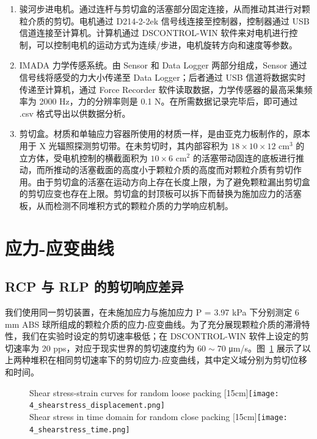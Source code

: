 \begin{enumerate}
    \item 骏河步进电机。通过连杆与剪切盒的活塞部分固定连接，从而推动其进行对颗粒介质的剪切。电机通过 D214-2-2ek 信号线连接至控制器，控制器通过 USB 信道连接至计算机。计算机通过 DSCONTROL-WIN 软件来对电机进行控制，可以控制电机的运动方式为连续/步进，电机旋转方向和速度等参数。
    \item IMADA 力学传感系统。由 Sensor 和 Data Logger 两部分组成，Sensor 通过信号线将感受的力大小传递至 Data Logger；后者通过 USB 信道将数据实时传递至计算机，通过 Force Recorder 软件读取数据，力学传感器的最高采集频率为 2000 \unit{\hertz}，力的分辨率则是 0.1 \unit{\newton}。在所需数据记录完毕后，即可通过 .csv 格式导出以供数据分析。
    \item 剪切盒。材质和单轴应力容器所使用的材质一样，是由亚克力板制作的，原本用于 X 光辐照探测剪切带。在未剪切时，其内部容积为 $18\times 10\times 12$ $\unit{\centi\meter}^{3}$ 的立方体，受电机控制的横截面积为 $10\times 6$ $\unit{\centi\meter}^{2}$ 的活塞带动固连的底板进行推动，而所推动的活塞截面的高度小于颗粒介质的高度而对颗粒介质有剪切作用。由于剪切盒的活塞在运动方向上存在长度上限，为了避免颗粒漏出剪切盒的剪切应变也存在上限。剪切盒的封顶板可以拆下而替换为施加应力的活塞板，从而检测不同堆积方式的颗粒介质的力学响应机制。
\end{enumerate}

\section{应力-应变曲线}

\subsection{RCP 与 RLP 的剪切响应差异}

我们使用同一剪切装置，在未施加应力与施加应力 P = 3.97 \unit{\kilo\pascal} 下分别测定 6 \unit{\milli\meter} ABS 球所组成的颗粒介质的应力-应变曲线。为了充分展现颗粒介质的滞滑特性，我们在实验时设定的剪切速率极低；在 DSCONTROL-WIN 软件上设定的剪切速率为 20 \unit{pps}，对应于现实世界的剪切速度约为 $60\sim 70$ \unit{\micro\meter}/\unit{\second}。图~\ref{fig:shearstress} 展示了以上两种堆积在相同剪切速率下的剪切应力-应变曲线，其中定义域分别为剪切位移和时间。

\begin{figure}[htbp]
	\centering
                  {Shear stress-strain curves for random loose packing}%
                  [15cm]{\texttt{[image: 4\_shearstress\_displacement.png]}}\\
                  {Shear stress in time domain for random close packing}%
                  [15cm]{\texttt{[image: 4\_shearstress\_time.png]}}
  \label{fig:shearstress}
\end{figure}

